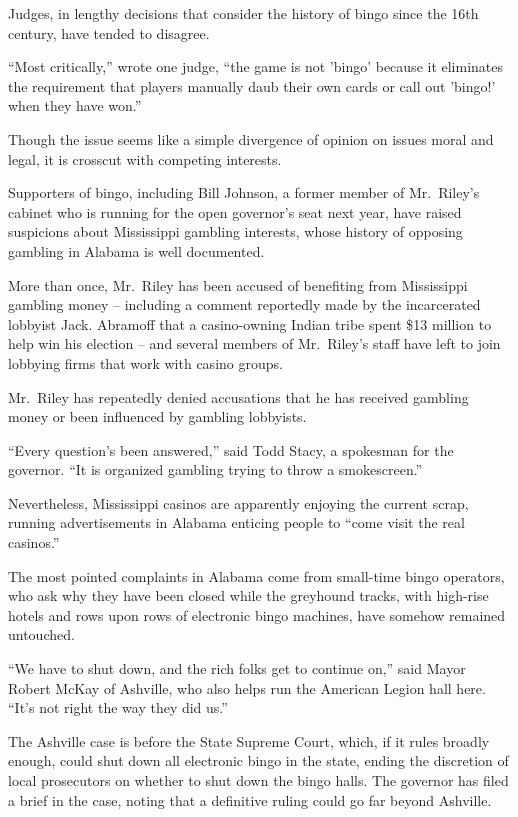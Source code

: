 ﻿\documentclass[12pt]{article}
\begin{document}
Judges, in lengthy decisions that consider the history of bingo since the 16th century, have tended
to disagree.

``Most critically,'' wrote one judge, ``the game is not 'bingo' because it eliminates the
requirement that players manually daub their own cards or call out 'bingo!' when they have won.''

Though the issue seems like a simple divergence of opinion on issues moral and legal, it is crosscut
with competing interests.

Supporters of bingo, including Bill Johnson, a former member of Mr.~Riley's cabinet who is running
for the open governor's seat next year, have raised suspicions about Mississippi gambling interests,
whose history of opposing gambling in Alabama is well documented.

More than once, Mr.~Riley has been accused of benefiting from Mississippi gambling money --
including a comment reportedly made by the incarcerated lobbyist Jack. Abramoff that a casino-owning
Indian tribe spent \$13 million to help win his election -- and several members of Mr.~Riley's staff
have left to join lobbying firms that work with casino groups.

Mr.~Riley has repeatedly denied accusations that he has received gambling money or been influenced
by gambling lobbyists.

``Every question's been answered,'' said Todd Stacy, a spokesman for the governor. ``It is organized
gambling trying to throw a smokescreen.''

Nevertheless, Mississippi casinos are apparently enjoying the current scrap, running advertisements
in Alabama enticing people to ``come visit the real casinos.''

The most pointed complaints in Alabama come from small-time bingo operators, who ask why they have
been closed while the greyhound tracks, with high-rise hotels and rows upon rows of electronic bingo
machines, have somehow remained untouched.

``We have to shut down, and the rich folks get to continue on,'' said Mayor Robert McKay of
Ashville, who also helps run the American Legion hall here. ``It's not right the way they did us.''

The Ashville case is before the State Supreme Court, which, if it rules broadly enough, could shut
down all electronic bingo in the state, ending the discretion of local prosecutors on whether to
shut down the bingo halls. The governor has filed a brief in the case, noting that a definitive
ruling could go far beyond Ashville.
\end{document}
